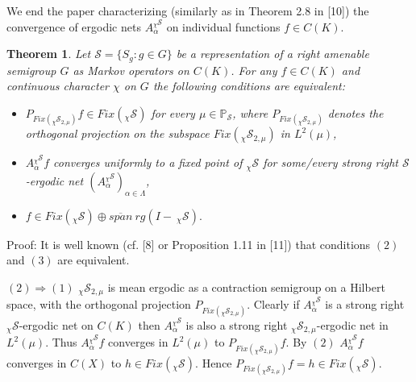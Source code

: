 \documentclass{amsart}
\newtheorem{thm}{Theorem}[section]
\theoremstyle{definition}
\theoremstyle{remark}
\numberwithin{equation}{section}
\newcommand{\bs}{\rightline{$\blacksquare$}}
\begin{document}
\bs

We end the paper characterizing (similarly as in Theorem 2.8 in [10]) the convergence of  ergodic nets $A_{\alpha}^{_{\chi}\mathcal{S}}$
on individual functions $f \in C(K)$. 

\begin{thm}
Let $\mathcal{S} = \{ S_g : g\in G \}$ be a representation of a right amenable semigroup $G$ as Markov operators on $C(K)$. For any $f \in C(K)$ and continuous character $\chi$ on $G$ the following conditions are equivalent:
\begin{itemize}
\item[(1)] $P_{Fix(_{\chi}\mathcal{S}_{2,\mu})}f \in Fix(_{\chi}\mathcal{S})$ for every $\mu \in \mathbb{P}_{\mathcal{S}}$, where $P_{Fix(_{\chi}\mathcal{S}_{2,\mu})}$ denotes the orthogonal projection on the subspace $Fix(_{\chi}\mathcal{S}_{2,\mu})$ in $L^2(\mu)$,
\item[(2)] $A_{\alpha}^{_{\chi}\mathcal{S}} f$ converges uniformly to a fixed point of $_{\chi}\mathcal{S}$ for some/every strong right $\mathcal{S}$-ergodic net $(A_{\alpha}^{_{\chi}\mathcal{S}})_{\alpha \in \Lambda}$,
\item[(3)] $f \in Fix(_{\chi}\mathcal{S}) \oplus \overline{span}\ rg (I -\ _{\chi}\mathcal{S}).$
\end{itemize}
\end{thm}

Proof: It is well known (cf. [8] or Proposition 1.11 in [11]) that conditions $(2)$ and $(3)$ are equivalent.

$(2) \Rightarrow (1)$  $_{\chi}\mathcal{S}_{2,\mu}$ is mean ergodic as a contraction semigroup on a Hilbert space,
with the orthogonal projection $P_{Fix(_{\chi}\mathcal{S}_{2,\mu})}$. Clearly if $A_{\alpha}^{_{\chi}\mathcal{S}}$ is a strong right $_{\chi}\mathcal{S}$-ergodic net on $C(K)$ then $A_{\alpha}^{_{\chi}\mathcal{S}}$ is also a strong right $_{\chi}\mathcal{S}_{2,\mu}$-ergodic net in $L^2(\mu )$. Thus $A_{\alpha}^{_{\chi}\mathcal{S}} f$ converges in $L^2(\mu)$ to $P_{Fix(_{\chi}\mathcal{S}_{2,\mu})}f$. By $(2)$  $A_{\alpha}^{_{\chi}\mathcal{S}} f$ converges in $C(X)$ to $h \in Fix(_{\chi}\mathcal{S})$. Hence $P_{Fix(_{\chi}\mathcal{S}_{2,\mu})}f = h \in Fix(_{\chi}\mathcal{S})$.
\end{document}
